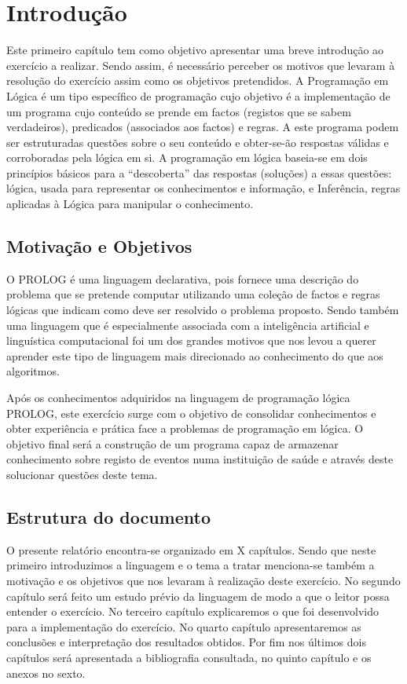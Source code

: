 \chapter{Introdução}
\label{cap:p1}
Este primeiro capítulo tem como objetivo apresentar uma breve introdução ao exercício a realizar. Sendo assim, é necessário perceber os motivos que levaram à resolução do exercício assim como os objetivos pretendidos.
A Programação em Lógica é um tipo específico de programação cujo objetivo é a implementação de um programa cujo conteúdo se prende em factos (registos que se sabem verdadeiros), predicados (associados aos factos) e regras. A este programa podem ser estruturadas questões sobre o seu conteúdo e obter-se-ão respostas válidas e corroboradas pela lógica em si.
A programação em lógica baseia-se em dois princípios básicos para a “descoberta” das respostas (soluções) a essas questões: lógica, usada para representar os conhecimentos e informação, e Inferência, regras aplicadas à Lógica para manipular o conhecimento.




\section{Motivação e Objetivos}
\label{p1:MotivObj}
O PROLOG é uma linguagem declarativa, pois fornece uma descrição do problema que se pretende computar utilizando uma coleção de factos e regras lógicas que indicam como deve ser resolvido o problema proposto. Sendo também uma linguagem que é especialmente associada com a inteligência artificial e linguística computacional foi um dos grandes motivos que nos levou a querer aprender este tipo de linguagem mais direcionado ao conhecimento do que aos algoritmos. 


Após os conhecimentos adquiridos na linguagem de programação lógica PROLOG, este exercício surge com o objetivo de consolidar conhecimentos e obter experiência e prática face a problemas de programação em lógica. O objetivo final será a construção de um programa capaz de armazenar conhecimento sobre registo de eventos numa instituição de saúde e através deste solucionar questões deste tema.



\section{Estrutura do documento}
\label{p1:Estrutura}
O presente relatório encontra-se organizado em X capítulos. Sendo que neste primeiro introduzimos a linguagem e o tema a tratar menciona-se também a motivação e os objetivos que nos levaram à realização deste exercício. 
No segundo capítulo será feito um estudo prévio da linguagem de modo a que o leitor possa entender o exercício. No terceiro capítulo explicaremos o que foi desenvolvido para a implementação do exercício. No quarto capítulo apresentaremos as conclusões e interpretação dos resultados obtidos. Por fim nos últimos dois capítulos será apresentada a bibliografia consultada, no quinto capítulo e os anexos no sexto. 





